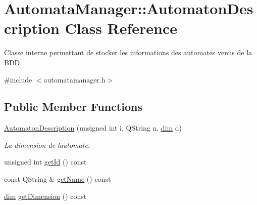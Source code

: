 \hypertarget{class_automata_manager_1_1_automaton_description}{}\section{Automata\+Manager\+:\+:Automaton\+Description Class Reference}
\label{class_automata_manager_1_1_automaton_description}


Classe interne permettant de stocker les informations des automates venus de la B\+DD.  




{\ttfamily \#include $<$automatamanager.\+h$>$}

\subsection*{Public Member Functions}
\begin{DoxyCompactItemize}
\item 
\mbox{\hyperlink{class_automata_manager_1_1_automaton_description_a48061cac5f3504b783a9949dfab6fefa}{Automaton\+Description}} (unsigned int i, Q\+String n, \mbox{\hyperlink{automatamanager_8h_ae6fa959b9e8f9c638e0d82bf2c7dc5e7}{dim}} d)
\begin{DoxyCompactList}\small\item\em La dimension de l\textquotesingle{}automate. \end{DoxyCompactList}\item 
unsigned int \mbox{\hyperlink{class_automata_manager_1_1_automaton_description_af88c7761e97cce2c29f25cc2785aad32}{get\+Id}} () const
\item 
const Q\+String \& \mbox{\hyperlink{class_automata_manager_1_1_automaton_description_aa84f4a3b752e9d12a84fe622c1a580c6}{get\+Name}} () const
\item 
\mbox{\hyperlink{automatamanager_8h_ae6fa959b9e8f9c638e0d82bf2c7dc5e7}{dim}} \mbox{\hyperlink{class_automata_manager_1_1_automaton_description_ac63a29de02d4862fb41b3beba034b839}{get\+Dimension}} () const
\end{DoxyCompactItemize}
